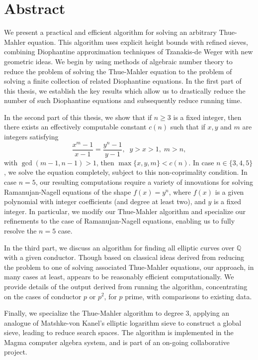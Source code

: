 
\chapter{Abstract}

We present a practical and efficient algorithm for solving an arbitrary Thue-Mahler equation. This algorithm uses explicit height bounds with refined sieves, combining Diophantine approximation techniques of Tzanakis-de Weger with new geometric ideas. We begin by using methods of algebraic number theory to reduce the problem of solving the Thue-Mahler equation to the problem of solving a finite collection of related Diophantine equations. In the first part of this thesis, we establish the key results which allow us to drastically reduce the number of such Diophantine equations and subsequently reduce running time. 

In the second part of this thesis, we show that if $n \geq 3$ is a fixed integer, then there exists an effectively computable constant $c (n)$ such that if $x, y$ and $m$ are integers satisfying
$$
\frac{x^m-1}{x-1} = \frac{y^n-1}{y-1}, \; \; y>x>1, \; m > n,
$$
with $\gcd(m-1,n-1)>1$,
then $\max \{ x, y, m \} < c (n)$. In case $n \in \{ 3, 4, 5 \}$, we solve the equation completely, subject to this non-coprimality condition.  In case $n=5$, our resulting computations require a variety of innovations for solving Ramanujan-Nagell equations of the shape $f(x)=y^n$, where $f(x)$ is a given polynomial with integer coefficients (and degree at least two), and $y$ is a fixed integer. In particular, we modify our Thue-Mahler algorithm and specialize our refinements to the case of Ramanujan-Nagell equations, enabling us to fully resolve the $n = 5$ case. 

In the third part, we discuss an algorithm for finding all elliptic curves over $\mathbb{Q}$ with a given conductor. Though based on 
classical ideas derived from reducing the problem to one of solving associated Thue-Mahler equations,  our approach, in many cases at least, appears to be reasonably efficient  computationally. We provide 
details of the output derived from running the algorithm, concentrating on the cases of conductor $p$ or $p^2$, for $p$ prime, with comparisons to existing 
data. 

Finally, we specialize the Thue-Mahler algorithm to degree $3$, applying an analogue of Matshke-von Kanel's elliptic logarithm sieve to construct a global sieve, leading to reduce search spaces. The algorithm is implemented in the Magma computer algebra system, and is part of an on-going collaborative project. 



